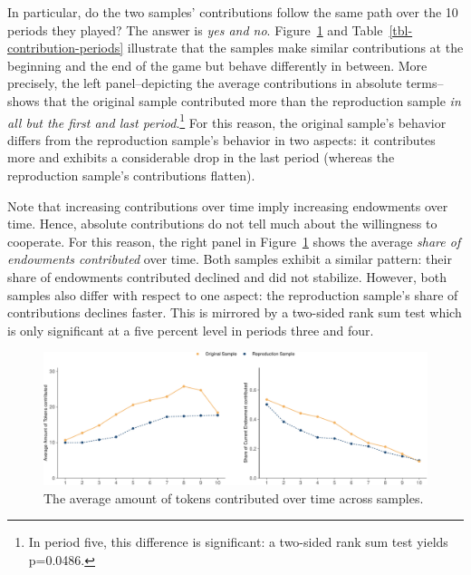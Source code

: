 \documentclass[
  authoryear,
  review,
  3p,
  onecolumn]{elsarticle}
\begin{document}
In particular, do the two samples' contributions follow the same path
over the 10 periods they played? The answer is \emph{yes and no}.
Figure~\ref{fig-share-of-contributions} and
Table~\ref{tbl-contribution-periods} illustrate that the samples make
similar contributions at the beginning and the end of the game but
behave differently in between. More precisely, the left panel--depicting
the average contributions in absolute terms--shows that the original
sample contributed more than the reproduction sample \emph{in all but
the first and last period}.\footnote{In period five, this difference is
  significant: a two-sided rank sum test yields p=0.0486.} For this
reason, the original sample's behavior differs from the reproduction
sample's behavior in two aspects: it contributes more and exhibits a
considerable drop in the last period (whereas the reproduction sample's
contributions flatten).

Note that increasing contributions over time imply increasing endowments
over time. Hence, absolute contributions do not tell much about the
willingness to cooperate. For this reason, the right panel in
Figure~\ref{fig-share-of-contributions} shows the average \emph{share of
endowments contributed} over time. Both samples exhibit a similar
pattern: their share of endowments contributed declined and did not
stabilize. However, both samples also differ with respect to one aspect:
the reproduction sample's share of contributions declines faster. This
is mirrored by a two-sided rank sum test which is only significant at a
five percent level in periods three and four.

\begin{figure}

{\centering \includegraphics{paper_files/figure-pdf/fig-share-of-contributions-1.pdf}

}

\caption{\label{fig-share-of-contributions}The average amount of tokens
contributed over time across samples.}

\end{figure}
\end{document}
